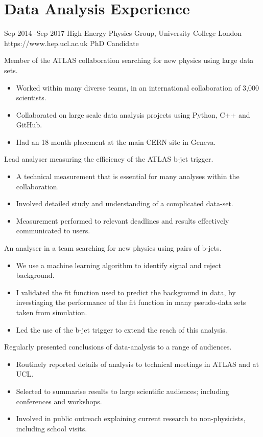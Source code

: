 \documentclass[10pt]{article} %
\begin{document}
\section{Data Analysis Experience}
\job
{Sep 2014 -}{Sep 2017}
{High Energy Physics Group, University College London}
{https://www.hep.ucl.ac.uk}
{PhD Candidate}
{
  \begin{itemize-noindent}
  \item{Member of the ATLAS collaboration searching for new physics using large data sets.}
    \begin{itemize}
    \item{Worked within many diverse teams, in an international collaboration of 3,000 scientists.}
    \item{Collaborated on large scale data analysis projects using Python, C++ and GitHub.}
    \item{Had an 18 month placement at the main CERN site in Geneva.} 
    \end{itemize}
  \item{Lead analyser measuring the efficiency of the ATLAS b-jet trigger.}
    \begin{itemize}
    \item{A technical measurement that is essential for many analyses within the collaboration.}
    \item{Involved detailed study and understanding of a complicated data-set.}
    \item{Measurement performed to relevant deadlines and results effectively communicated to users.}
    \end{itemize}
  \item{ An analyser in a team searching for new physics using pairs of b-jets.}
    \begin{itemize}
    \item{We use a machine learning algorithm to identify signal and reject background.}
    \item{I validated the fit function used to predict the background in data,
      by investiaging the performance of the fit function in many pseudo-data sets taken from simulation.}
    \item{Led the use of the b-jet trigger to extend the reach of this analysis.}
    \end{itemize}
 \item{Regularly presented conclusions of data-analysis to a range of audiences.}
   \begin{itemize}
   \item{Routinely reported details of analysis to technical meetings in ATLAS and at UCL.}
   \item{Selected to summarise results to large scientific audiences; including conferences and workshops.}
   \item{Involved in public outreach explaining current research to non-physicists, including school visits.}
   \end{itemize}
 \end{itemize-noindent}
}
\end{document}
